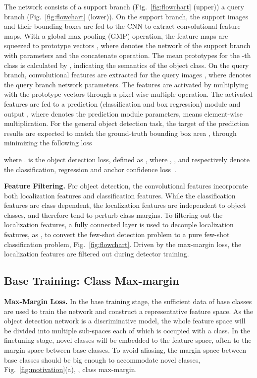 \documentclass[final]{cvpr}
\begin{document}
The network consists of a support branch (Fig.~\ref{fig:flowchart} (upper)) a query branch (Fig.~\ref{fig:flowchart} (lower)). On the support branch, the support images  and their bounding-boxes  are fed to the CNN to extract convolutional feature maps. With a global max pooling (GMP) operation, the feature maps are squeezed to prototype vectors , where  denotes the network of the support branch with parameters  and  the concatenate operation. The mean prototypes for the -th class is calculated by , indicating the semantics of the object class. 
On the query branch, convolutional features  are extracted for the query images , where  denotes the query branch network parameters. The features are activated by multiplying with the prototype vectors  through a pixel-wise multiple operation. 
The activated features are fed to a prediction (classification and box regression) module and output , where  denotes the prediction module parameters,  means element-wise multiplication. For the general object detection task, the target of the prediction results are expected to match the ground-truth bounding box area , through minimizing the following loss

where .  is the object detection loss, defined as , where , , and  respectively denote the classification, regression and anchor confidence loss~\cite{FeatureReweighting,YOLOV2}.

\textbf{Feature Filtering.} For object detection, the convolutional features incorporate both localization features and classification features. While the classification features are class dependent, the localization features are independent to object classes, and therefore tend to perturb class margins. To filtering out the localization features, a fully connected layer is used to decouple localization features, as , to convert the few-shot detection problem to a pure few-shot classification problem, Fig.\ \ref{fig:flowchart}. Driven by the max-margin loss, the localization features are filtered out during detector training.

\subsection{Base Training: Class Max-margin}

\textbf{Max-Margin Loss.}
In the base training stage, the sufficient data of base classes are used to train the network and construct a representative feature space. As the object detection network is a discriminative model, the whole feature space will be divided into multiple sub-spaces each of which is occupied with a class. 
In the finetuning stage, novel classes will be embedded to the feature space, often to the margin space between base classes. To avoid aliasing, the margin space between base classes should be big enough to accommodate novel classes, Fig.\ \ref{fig:motivation}(a), , class max-margin. 
\end{document}
